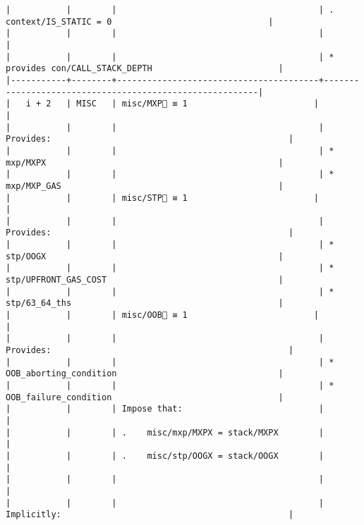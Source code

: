 \documentclass[varwidth=\maxdimen,margin=0.5cm,multi={verbatim}]{standalone}
\begin{document}
\begin{verbatim}
|           |        |                                        | .   context/IS_STATIC = 0                               |
|           |        |                                        |                                                         |
|           |        |                                        | * provides con/CALL_STACK_DEPTH                         |
|-----------+--------+----------------------------------------+---------------------------------------------------------|
|   i + 2   | MISC   | misc/MXP🚩 ≡ 1                         |                                                         |
|           |        |                                        | Provides:                                               |
|           |        |                                        | * mxp/MXPX                                              |
|           |        |                                        | * mxp/MXP_GAS                                           |
|           |        | misc/STP🚩 ≡ 1                         |                                                         |
|           |        |                                        | Provides:                                               |
|           |        |                                        | * stp/OOGX                                              |
|           |        |                                        | * stp/UPFRONT_GAS_COST                                  |
|           |        |                                        | * stp/63_64_ths                                         |
|           |        | misc/OOB🚩 ≡ 1                         |                                                         |
|           |        |                                        | Provides:                                               |
|           |        |                                        | * OOB_aborting_condition                                |
|           |        |                                        | * OOB_failure_condition                                 |
|           |        | Impose that:                           |                                                         |
|           |        | .    misc/mxp/MXPX = stack/MXPX        |                                                         |
|           |        | .    misc/stp/OOGX = stack/OOGX        |                                                         |
|           |        |                                        |                                                         |
|           |        |                                        | Implicitly:                                             |

\end{verbatim}
\end{document}

